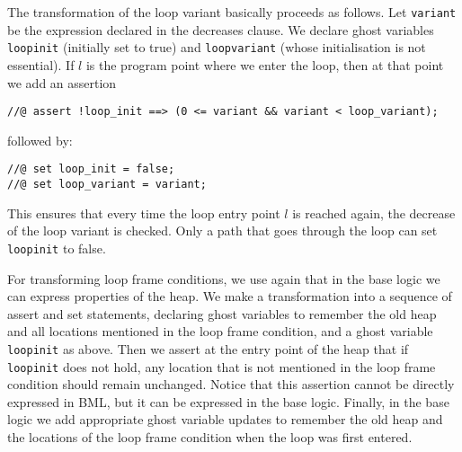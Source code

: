 The transformation of the loop variant basically proceeds as follows.
Let \texttt{variant} be the expression declared in the decreases
clause.  We declare ghost variables \texttt{loop\unsc init} (initially
set to true) and \texttt{loop\unsc variant} (whose initialisation is
not essential). If \(l\) is the program point where we enter the loop,
then at that point we add an assertion
\begin{verbatim}
//@ assert !loop_init ==> (0 <= variant && variant < loop_variant);
\end{verbatim}
followed by:
\begin{verbatim}
//@ set loop_init = false;
//@ set loop_variant = variant;
\end{verbatim}
This ensures that every time the loop entry point \(l\) is reached
again, the decrease of the loop variant is checked. Only a path that
goes through the loop can set \texttt{loop\unsc init} to false.

For transforming loop frame conditions, we use again that in the
\mobius base logic we can express properties of the heap. 
We make a transformation into a sequence of assert and set
statements, declaring ghost variables to remember the old heap and
all locations mentioned in the loop frame condition, and a ghost
variable \texttt{loop\unsc init} as above. Then we assert at the entry
point of the heap that if \texttt{loop\unsc init} does not hold, any
location that is not mentioned in the loop frame condition should
remain unchanged. Notice that this assertion cannot be directly
expressed in BML, but it can be expressed in the \mobius base
logic. Finally, in the \mobius base logic we add appropriate ghost
variable updates to remember the old heap and the locations of the
loop frame condition when the loop was first entered.










